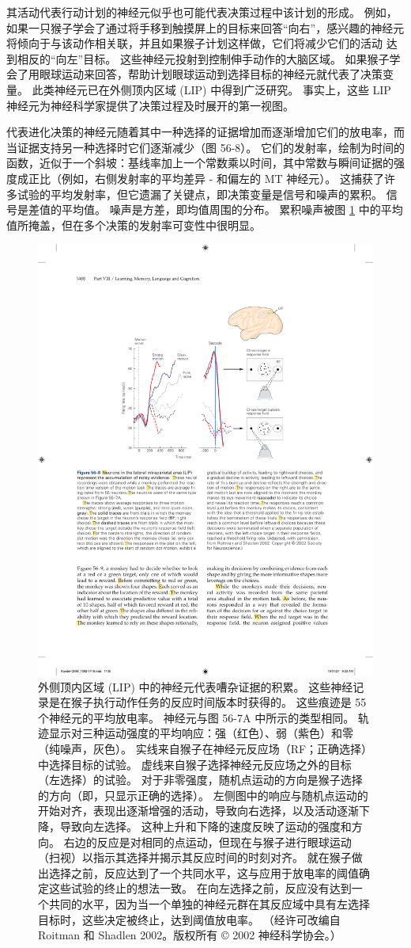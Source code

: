 其活动代表行动计划的神经元似乎也可能代表决策过程中该计划的形成。
例如，如果一只猴子学会了通过将手移到触摸屏上的目标来回答“向右”，感兴趣的神经元将倾向于与该动作相关联，并且如果猴子计划这样做，它们将减少它们的活动 达到相反的“向左”目标。
这些神经元投射到控制伸手动作的大脑区域。 如果猴子学会了用眼球运动来回答，帮助计划眼球运动到选择目标的神经元就代表了决策变量。
此类神经元已在外侧顶内区域 (LIP) 中得到广泛研究。
事实上，这些 LIP 神经元为神经科学家提供了决策过程及时展开的第一视图。


代表进化决策的神经元随着其中一种选择的证据增加而逐渐增加它们的放电率，而当证据支持另一种选择时它们逐渐减少（图 56-8）。
它们的发射率，绘制为时间的函数，近似于一个斜坡：基线率加上一个常数乘以时间，其中常数与瞬间证据的强度成正比（例如，右侧发射率的平均差异 - 和偏左的 MT 神经元）。
这捕获了许多试验的平均发射率，但它遗漏了关键点，即决策变量是信号和噪声的累积。
信号是差值的平均值。 噪声是方差，即均值周围的分布。
累积噪声被图 \ref{fig:56_8} 中的平均值所掩盖，但在多个决策的发射率可变性中很明显。


\begin{figure}[htbp]
	\centering
	\includegraphics[width=0.65\linewidth]{chap56/fig_56_8}
	\caption{外侧顶内区域 (LIP) 中的神经元代表嘈杂证据的积累。 这些神经记录是在猴子执行动作任务的反应时间版本时获得的。 这些痕迹是 55 个神经元的平均放电率。 神经元与图 56-7A 中所示的类型相同。 轨迹显示对三种运动强度的平均响应：强（红色）、弱（紫色）和零（纯噪声，灰色）。 实线来自猴子在神经元反应场（RF；正确选择）中选择目标的试验。 虚线来自猴子选择神经元反应场之外的目标（左选择）的试验。 对于非零强度，随机点运动的方向是猴子选择的方向（即，只显示正确的选择）。 左侧图中的响应与随机点运动的开始对齐，表现出逐渐增强的活动，导致向右选择，以及活动逐渐下降，导致向左选择。 这种上升和下降的速度反映了运动的强度和方向。 右边的反应是对相同的点运动，但现在与猴子进行眼球运动（扫视）以指示其选择并揭示其反应时间的时刻对齐。 就在猴子做出选择之前，反应达到了一个共同水平，这与应用于放电率的阈值确定这些试验的终止的想法一致。 在向左选择之前，反应没有达到一个共同的水平，因为当一个单独的神经元群在其反应域中具有左选择目标时，这些决定被终止，达到阈值放电率。 （经许可改编自 Roitman 和 Shadlen 2002。版权所有 © 2002 神经科学协会。）}
	\label{fig:56_8}
\end{figure}


